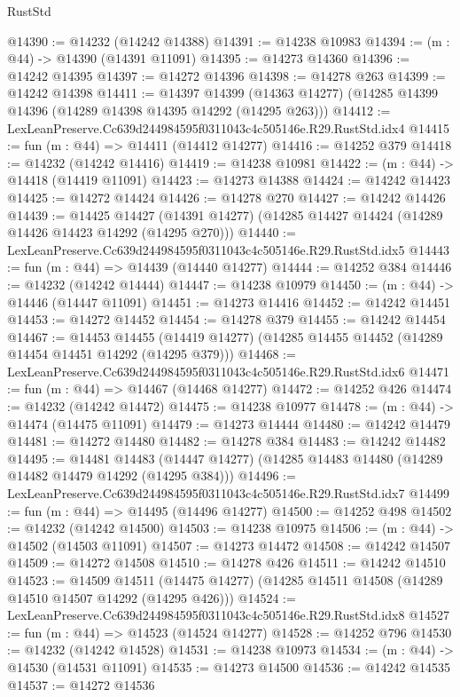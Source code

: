 \begin{lexlean}{RustStd}
\begin{coremodule}
@14390 := @14232 (@14242 @14388)
@14391 := @14238 @10983
@14394 := (m : @44) -> @14390 (@14391 @11091)
@14395 := @14273 @14360
@14396 := @14242 @14395
@14397 := @14272 @14396
@14398 := @14278 @263
@14399 := @14242 @14398
@14411 := @14397
    @14399
    (@14363 @14277)
    (@14285 @14399 @14396 (@14289 @14398 @14395 @14292 (@14295 @263)))
@14412 := LexLeanPreserve.Cc639d244984595f0311043c4c505146e.R29.RustStd.idx4
@14415 := fun (m : @44) => @14411 (@14412 @14277)
@14416 := @14252 @379
@14418 := @14232 (@14242 @14416)
@14419 := @14238 @10981
@14422 := (m : @44) -> @14418 (@14419 @11091)
@14423 := @14273 @14388
@14424 := @14242 @14423
@14425 := @14272 @14424
@14426 := @14278 @270
@14427 := @14242 @14426
@14439 := @14425
    @14427
    (@14391 @14277)
    (@14285 @14427 @14424 (@14289 @14426 @14423 @14292 (@14295 @270)))
@14440 := LexLeanPreserve.Cc639d244984595f0311043c4c505146e.R29.RustStd.idx5
@14443 := fun (m : @44) => @14439 (@14440 @14277)
@14444 := @14252 @384
@14446 := @14232 (@14242 @14444)
@14447 := @14238 @10979
@14450 := (m : @44) -> @14446 (@14447 @11091)
@14451 := @14273 @14416
@14452 := @14242 @14451
@14453 := @14272 @14452
@14454 := @14278 @379
@14455 := @14242 @14454
@14467 := @14453
    @14455
    (@14419 @14277)
    (@14285 @14455 @14452 (@14289 @14454 @14451 @14292 (@14295 @379)))
@14468 := LexLeanPreserve.Cc639d244984595f0311043c4c505146e.R29.RustStd.idx6
@14471 := fun (m : @44) => @14467 (@14468 @14277)
@14472 := @14252 @426
@14474 := @14232 (@14242 @14472)
@14475 := @14238 @10977
@14478 := (m : @44) -> @14474 (@14475 @11091)
@14479 := @14273 @14444
@14480 := @14242 @14479
@14481 := @14272 @14480
@14482 := @14278 @384
@14483 := @14242 @14482
@14495 := @14481
    @14483
    (@14447 @14277)
    (@14285 @14483 @14480 (@14289 @14482 @14479 @14292 (@14295 @384)))
@14496 := LexLeanPreserve.Cc639d244984595f0311043c4c505146e.R29.RustStd.idx7
@14499 := fun (m : @44) => @14495 (@14496 @14277)
@14500 := @14252 @498
@14502 := @14232 (@14242 @14500)
@14503 := @14238 @10975
@14506 := (m : @44) -> @14502 (@14503 @11091)
@14507 := @14273 @14472
@14508 := @14242 @14507
@14509 := @14272 @14508
@14510 := @14278 @426
@14511 := @14242 @14510
@14523 := @14509
    @14511
    (@14475 @14277)
    (@14285 @14511 @14508 (@14289 @14510 @14507 @14292 (@14295 @426)))
@14524 := LexLeanPreserve.Cc639d244984595f0311043c4c505146e.R29.RustStd.idx8
@14527 := fun (m : @44) => @14523 (@14524 @14277)
@14528 := @14252 @796
@14530 := @14232 (@14242 @14528)
@14531 := @14238 @10973
@14534 := (m : @44) -> @14530 (@14531 @11091)
@14535 := @14273 @14500
@14536 := @14242 @14535
@14537 := @14272 @14536

\end{coremodule}
\end{lexlean}
